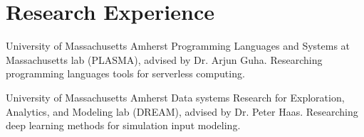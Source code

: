 \section{Research Experience}

%
{University of Massachusetts Amherst}%
{}%
{}%
{Programming Languages and Systems at Massachusetts lab (PLASMA), advised by Dr.
Arjun Guha. Researching programming languages tools for serverless computing.
%
\newline{}
}

%
{University of Massachusetts Amherst}%
{}%
{}%
{Data systems Research for Exploration, Analytics, and Modeling lab (DREAM),
advised by Dr. Peter Haas. Researching deep learning methods for simulation input
modeling.
%
}